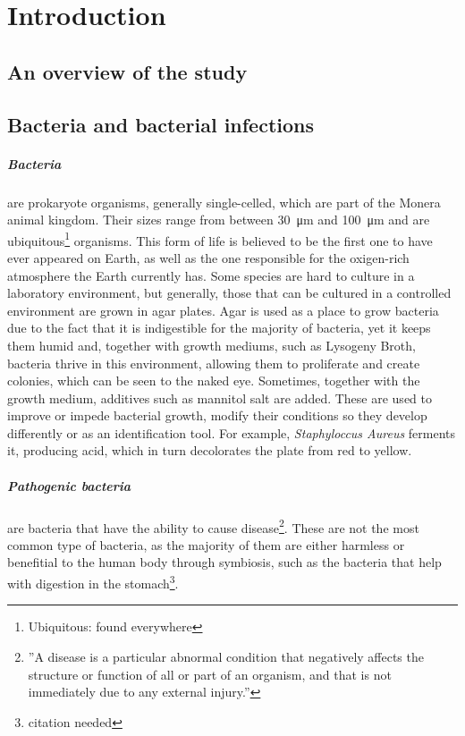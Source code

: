 \chapter{Introduction}
\section{An overview of the study}

\section{Bacteria and bacterial infections}
\paragraph{Bacteria} are prokaryote organisms, generally single-celled, which are part of the Monera animal kingdom. Their sizes range from between \SI{30}{\micro\metre} and \SI{100}{\micro\metre} and are ubiquitous\footnote{Ubiquitous: found everywhere} organisms. This form of life is believed to be the first one to have ever appeared on Earth, as well as the one responsible for the oxigen-rich atmosphere the Earth currently has. Some species are hard to culture in a laboratory environment, but generally, those that can be cultured in a controlled environment are grown in agar plates\cite{MicrobioMed}. \newline
Agar is used as a place to grow bacteria due to the fact that it is indigestible for the majority of bacteria, yet it keeps them humid and, together with growth mediums, such as Lysogeny Broth, bacteria thrive in this environment, allowing them to proliferate and create colonies, which can be seen to the naked eye. Sometimes, together with the growth medium, additives such as mannitol salt are added. These are used to improve or impede bacterial growth, modify their conditions so they develop differently or as an identification tool. For example, \emph{Staphyloccus Aureus} ferments it, producing acid, which in turn decolorates the plate from red to yellow.
\paragraph{Pathogenic bacteria} are bacteria that have the ability to cause disease\footnote{''A disease is a particular abnormal condition that negatively affects the structure or function of all or part of an organism, and that is not immediately due to any external injury.''\cite{dorlands:001}}. These are not the most common type of bacteria, as the majority of them are either harmless or benefitial to the human body through symbiosis, such as the bacteria that help with digestion in the stomach\footnote{citation needed}.


